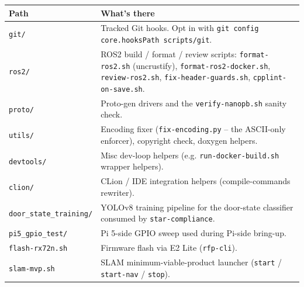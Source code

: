 \begin{center}
\begin{tabular}{|p{3.5cm}|p{11.0cm}|}
\hline
\textbf{Path}                  & \textbf{What's there}                                                                                                                                          \\
\hline
\texttt{git/}                  & Tracked Git hooks. Opt in with \texttt{git config core.hooksPath scripts/git}.                                                                                  \\
\texttt{ros2/}                 & ROS2 build / format / review scripts: \texttt{format-ros2.sh} (uncrustify), \texttt{format-ros2-docker.sh}, \texttt{review-ros2.sh}, \texttt{fix-header-guards.sh}, \texttt{cpplint-on-save.sh}. \\
\texttt{proto/}                & Proto-gen drivers and the \texttt{verify-nanopb.sh} sanity check.                                                                                                \\
\texttt{utils/}                & Encoding fixer (\texttt{fix-encoding.py} -- the ASCII-only enforcer), copyright check, doxygen helpers.                                                          \\
\texttt{devtools/}             & Misc dev-loop helpers (e.g. \texttt{run-docker-build.sh} wrapper helpers).                                                                                       \\
\texttt{clion/}                & CLion / IDE integration helpers (compile-commands rewriter).                                                                                                     \\
\texttt{door\_state\_training/} & YOLOv8 training pipeline for the door-state classifier consumed by \texttt{star-compliance}.                                                                    \\
\texttt{pi5\_gpio\_test/}      & Pi 5-side GPIO sweep used during Pi-side bring-up.                                                                                                               \\
\texttt{flash-rx72n.sh}        & Firmware flash via E2 Lite (\texttt{rfp-cli}).                                                                                                                   \\
\texttt{slam-mvp.sh}           & SLAM minimum-viable-product launcher (\texttt{start} / \texttt{start-nav} / \texttt{stop}).                                                                       \\

\end{tabular}
\end{center}
